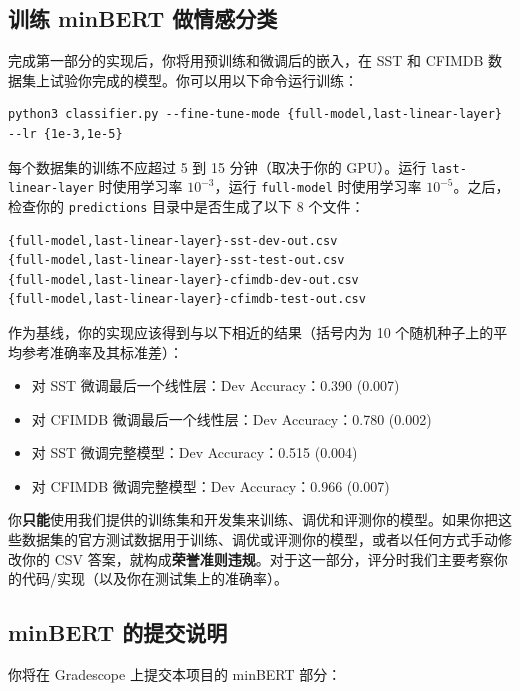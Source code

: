 \documentclass[11pt]{article}
\begin{document}
\subsection{训练 minBERT 做情感分类}

完成第一部分的实现后，你将用预训练和微调后的嵌入，在 SST 和 CFIMDB 数据集上试验你完成的模型。你可以用以下命令运行训练：

\begin{lstlisting}[numbers=none]
python3 classifier.py --fine-tune-mode {full-model,last-linear-layer} --lr {1e-3,1e-5}
\end{lstlisting}

每个数据集的训练不应超过 5 到 15 分钟（取决于你的 GPU）。运行 \texttt{last-linear-layer} 时使用学习率 $10^{-3}$，运行 \texttt{full-model} 时使用学习率 $10^{-5}$。之后，检查你的 \texttt{predictions} 目录中是否生成了以下 8 个文件：

\begin{lstlisting}[numbers=none]
{full-model,last-linear-layer}-sst-dev-out.csv
{full-model,last-linear-layer}-sst-test-out.csv
{full-model,last-linear-layer}-cfimdb-dev-out.csv
{full-model,last-linear-layer}-cfimdb-test-out.csv
\end{lstlisting}

作为基线，你的实现应该得到与以下相近的结果（括号内为 10 个随机种子上的平均参考准确率及其标准差）：

\begin{itemize}[leftmargin=1.5em]
  \item 对 SST 微调最后一个线性层：Dev Accuracy：0.390 (0.007)
  \item 对 CFIMDB 微调最后一个线性层：Dev Accuracy：0.780 (0.002)
  \item 对 SST 微调完整模型：Dev Accuracy：0.515 (0.004)
  \item 对 CFIMDB 微调完整模型：Dev Accuracy：0.966 (0.007)
\end{itemize}

你\textbf{只能}使用我们提供的训练集和开发集来训练、调优和评测你的模型。如果你把这些数据集的官方测试数据用于训练、调优或评测你的模型，或者以任何方式手动修改你的 CSV 答案，就构成\textbf{荣誉准则违规}。对于这一部分，评分时我们主要考察你的代码/实现（以及你在测试集上的准确率）。

\subsection{minBERT 的提交说明}

你将在 Gradescope 上提交本项目的 minBERT 部分：
\end{document}
